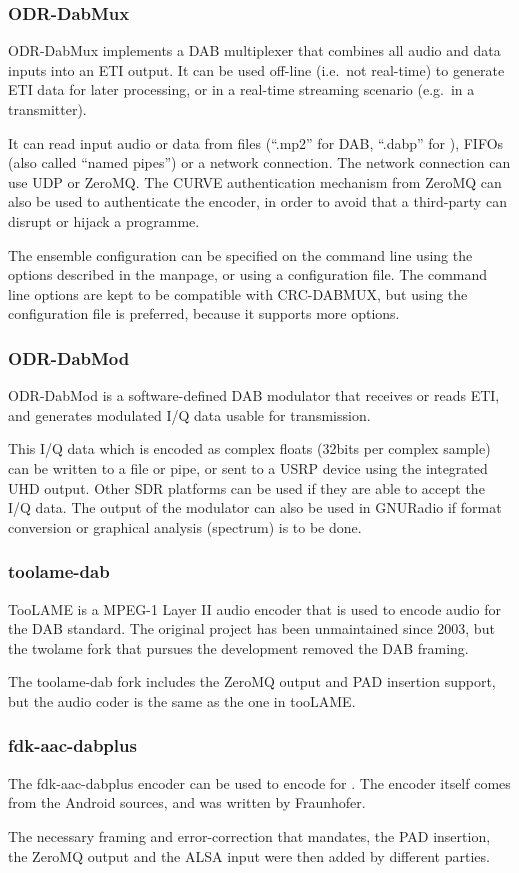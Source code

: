 \subsubsection{ODR-DabMux}
ODR-DabMux implements a DAB multiplexer that combines all audio and data inputs
into an ETI output. It can be used off-line (i.e.~not real-time) to generate ETI
data for later processing, or in a real-time streaming scenario (e.g.~in a
transmitter).

It can read input audio or data from files (``.mp2'' for DAB, ``.dabp'' for
\dabplus), FIFOs (also called ``named pipes'') or a network connection. The
network connection can use UDP or ZeroMQ. The CURVE authentication mechanism
from ZeroMQ can also be used to authenticate the encoder, in order to avoid that
a third-party can disrupt or hijack a programme.

The ensemble configuration can be specified on the command line using the
options described in the manpage, or using a configuration file. The command
line options are kept to be compatible with CRC-DABMUX, but using the
configuration file is preferred, because it supports more options.


\subsubsection{ODR-DabMod}
ODR-DabMod is a software-defined DAB modulator that receives or reads ETI, and
generates modulated I/Q data usable for transmission.

This I/Q data which is encoded as complex floats (32bits per complex sample) can
be written to a file or pipe, or sent to a USRP device using the integrated UHD
output. Other SDR platforms can be used if they are able to accept the I/Q data.
The output of the modulator can also be used in GNURadio if format conversion or
graphical analysis (spectrum) is to be done.

\subsubsection{toolame-dab}
TooLAME is a MPEG-1 Layer II audio encoder that is used to encode audio for the
DAB standard. The original project has been unmaintained since 2003, but the
twolame fork that pursues the development removed the DAB framing.

The toolame-dab fork includes the ZeroMQ output and PAD insertion support, but
the audio coder is the same as the one in tooLAME.

\subsubsection{fdk-aac-dabplus}
The fdk-aac-dabplus encoder can be used to encode for \dabplus. The encoder
itself comes from the Android sources, and was written by Fraunhofer.

The necessary framing and error-correction that \dabplus mandates, the PAD
insertion, the ZeroMQ output and the ALSA input were then added by different
parties.



